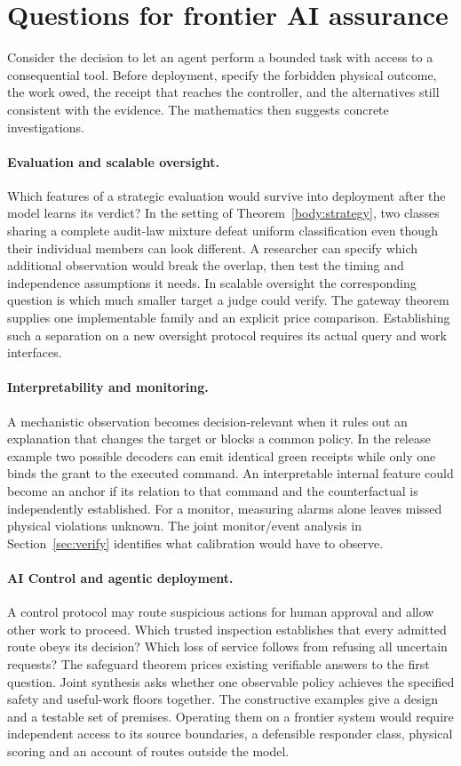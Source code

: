 \section{Questions for frontier AI assurance}\label{sec:implications}
Consider the decision to let an agent perform a bounded task with access to a consequential tool. Before deployment, specify the forbidden physical outcome, the work owed, the receipt that reaches the controller, and the alternatives still consistent with the evidence. The mathematics then suggests concrete investigations.

\paragraph{Evaluation and scalable oversight.}
Which features of a strategic evaluation would survive into deployment after the model learns its verdict? In the setting of Theorem~\ref{body:strategy}, two classes sharing a complete audit-law mixture defeat uniform classification even though their individual members can look different. A researcher can specify which additional observation would break the overlap, then test the timing and independence assumptions it needs. In scalable oversight the corresponding question is which much smaller target a judge could verify. The gateway theorem supplies one implementable family and an explicit price comparison. Establishing such a separation on a new oversight protocol requires its actual query and work interfaces.

\paragraph{Interpretability and monitoring.}
A mechanistic observation becomes decision-relevant when it rules out an explanation that changes the target or blocks a common policy. In the release example two possible decoders can emit identical green receipts while only one binds the grant to the executed command. An interpretable internal feature could become an anchor if its relation to that command and the counterfactual is independently established. For a monitor, measuring alarms alone leaves missed physical violations unknown. The joint monitor/event analysis in Section~\ref{sec:verify} identifies what calibration would have to observe.

\paragraph{AI Control and agentic deployment.}
A control protocol may route suspicious actions for human approval and allow other work to proceed. Which trusted inspection establishes that every admitted route obeys its decision? Which loss of service follows from refusing all uncertain requests? The safeguard theorem prices existing verifiable answers to the first question. Joint synthesis asks whether one observable policy achieves the specified safety and useful-work floors together. The constructive examples give a design and a testable set of premises. Operating them on a frontier system would require independent access to its source boundaries, a defensible responder class, physical scoring and an account of routes outside the model.

